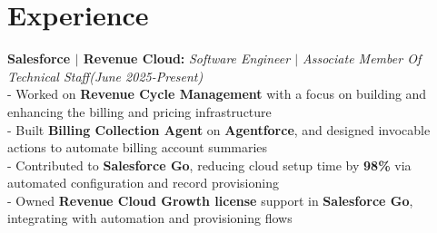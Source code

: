\documentclass[a4paper,10pt]{article}
\begin{document}
\section{\textbf{Experience}}
\textbf{Salesforce $\mid$ Revenue Cloud:} \textit{Software Engineer $\mid$ Associate Member Of Technical Staff}\hfill\textit{(June 2025-Present) }\\
- Worked on \textbf{Revenue Cycle Management} with a focus on building and enhancing the billing and pricing infrastructure\\
- Built \textbf{Billing Collection Agent} on \textbf{Agentforce}, and designed invocable actions to automate billing account summaries\\
- Contributed to \textbf{Salesforce Go}, reducing cloud setup time by \textbf{98\%} via automated configuration and record provisioning\\
- Owned \textbf{Revenue Cloud Growth license} support in \textbf{Salesforce Go}, integrating with automation and provisioning flows
\end{document}
